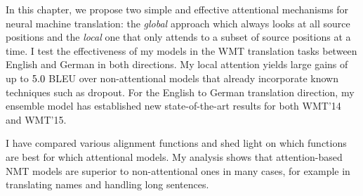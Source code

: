 In this chapter, we propose two simple and effective attentional mechanisms for
neural machine translation: the {\it global} approach which always looks at all
source positions and the {\it local} one that only attends to a subset of source
positions at a time. I test the effectiveness of my models in the WMT
translation tasks between English and German in both directions. 
My local attention yields large gains of up to
$5.0{}$ BLEU over non-attentional models that already incorporate known
techniques such as dropout. For the English to German translation direction, my
ensemble model has established new state-of-the-art
results for both WMT'14 and WMT'15.

I have compared various alignment functions and shed light on which functions
are best for which attentional models.
My analysis shows that attention-based NMT models are superior to
non-attentional ones in many cases, for example in translating names and
handling long
sentences.
